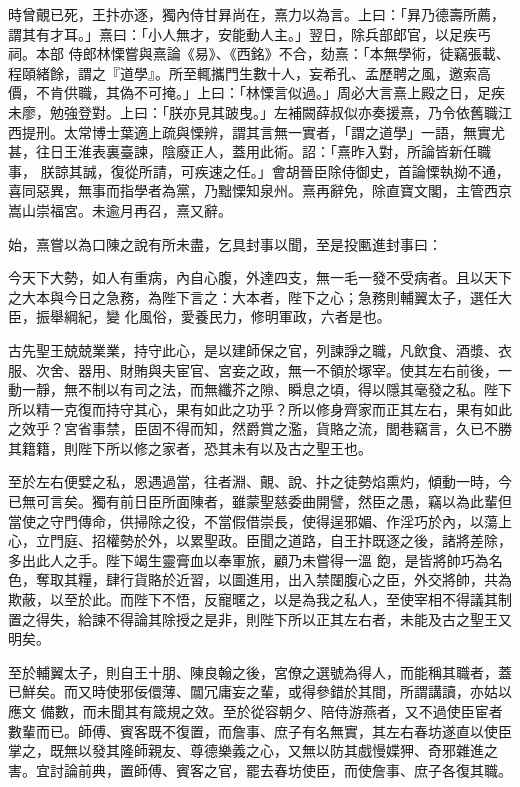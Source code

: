 \begin{pinyinscope}
 時曾覿已死，王抃亦逐，獨內侍甘昪尚在，熹力以為言。上曰：「昪乃德壽所薦，謂其有才耳。」熹曰：「小人無才，安能動人主。」翌日，除兵部郎官，以足疾丐祠。本部
 侍郎林慄嘗與熹論《易》、《西銘》不合，劾熹：「本無學術，徒竊張載、程頤緒餘，謂之『道學』。所至輒攜門生數十人，妄希孔、孟歷聘之風，邀索高價，不肯供職，其偽不可掩。」上曰：「林慄言似過。」周必大言熹上殿之日，足疾未廖，勉強登對。上曰：「朕亦見其跛曳。」左補闕薛叔似亦奏援熹，乃令依舊職江西提刑。太常博士葉適上疏與慄辨，謂其言無一實者，「謂之道學」一語，無實尤甚，往日王淮表裏臺諫，陰廢正人，蓋用此術。詔：「熹昨入對，所論皆新任職事，
 朕諒其誠，復從所請，可疾速之任。」會胡晉臣除侍御史，首論慄執拗不通，喜同惡異，無事而指學者為黨，乃黜慄知泉州。熹再辭免，除直寶文閣，主管西京嵩山崇福宮。未逾月再召，熹又辭。



 始，熹嘗以為口陳之說有所未盡，乞具封事以聞，至是投匭進封事曰：



 今天下大勢，如人有重病，內自心腹，外達四支，無一毛一發不受病者。且以天下之大本與今日之急務，為陛下言之：大本者，陛下之心；急務則輔翼太子，選任大臣，振舉綱紀，變
 化風俗，愛養民力，修明軍政，六者是也。



 古先聖王兢兢業業，持守此心，是以建師保之官，列諫諍之職，凡飲食、酒漿、衣服、次舍、器用、財賄與夫宦官、宮妾之政，無一不領於塚宰。使其左右前後，一動一靜，無不制以有司之法，而無纖芥之隙、瞬息之頃，得以隱其毫發之私。陛下所以精一克復而持守其心，果有如此之功乎？所以修身齊家而正其左右，果有如此之效乎？宮省事禁，臣固不得而知，然爵賞之濫，貨賂之流，閭巷竊言，久已不勝
 其籍籍，則陛下所以修之家者，恐其未有以及古之聖王也。



 至於左右便嬖之私，恩遇過當，往者淵、覿、說、抃之徒勢焰熏灼，傾動一時，今已無可言矣。獨有前日臣所面陳者，雖蒙聖慈委曲開譬，然臣之愚，竊以為此輩但當使之守門傳命，供掃除之役，不當假借崇長，使得逞邪媚、作淫巧於內，以蕩上心，立門庭、招權勢於外，以累聖政。臣聞之道路，自王抃既逐之後，諸將差除，多出此人之手。陛下竭生靈膏血以奉軍旅，顧乃未嘗得一溫
 飽，是皆將帥巧為名色，奪取其糧，肆行貨賂於近習，以圖進用，出入禁闥腹心之臣，外交將帥，共為欺蔽，以至於此。而陛下不悟，反寵暱之，以是為我之私人，至使宰相不得議其制置之得失，給諫不得論其除授之是非，則陛下所以正其左右者，未能及古之聖王又明矣。



 至於輔翼太子，則自王十朋、陳良翰之後，宮僚之選號為得人，而能稱其職者，蓋已鮮矣。而又時使邪佞儇薄、闒冗庸妄之輩，或得參錯於其間，所謂講讀，亦姑以應文
 備數，而未聞其有箴規之效。至於從容朝夕、陪侍游燕者，又不過使臣宦者數輩而已。師傅、賓客既不復置，而詹事、庶子有名無實，其左右春坊遂直以使臣掌之，既無以發其隆師親友、尊德樂義之心，又無以防其戲慢媟狎、奇邪雜進之害。宜討論前典，置師傅、賓客之官，罷去春坊使臣，而使詹事、庶子各復其職。




\end{pinyinscope}
